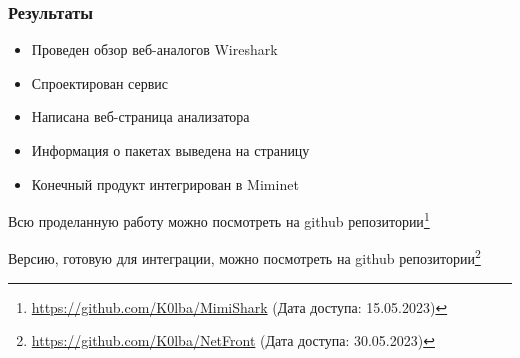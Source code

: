 \documentclass[aspectratio=169]{beamer}
\begin{document}

\begin{frame}
	\frametitle{Результаты}
	\begin{itemize}
		\item Проведен обзор веб-аналогов Wireshark
		\item Спроектирован сервис
		\item Написана веб-страница анализатора
		\item Информация о пакетах выведена на страницу
		\item Конечный продукт интегрирован в Miminet
	\end{itemize}

	\vspace{20mm}
	Всю проделанную работу можно посмотреть на github репозитории\footnote{\url{https://github.com/K0lba/MimiShark} (Дата доступа: 15.05.2023)}

	Версию, готовую для интеграции, можно посмотреть на github репозитории\footnote{\url{https://github.com/K0lba/NetFront} (Дата доступа: 30.05.2023)}

\end{frame}

	


\end{document}
